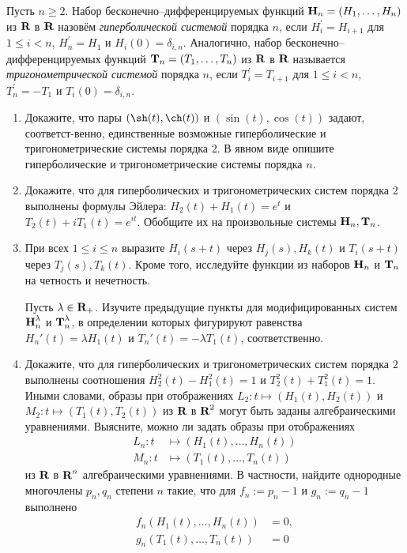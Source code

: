 \newcommand{\mmH}{\text{\bfseries H}}
\newcommand{\mmT}{\text{\bfseries T}}

Пусть $n \geq 2$. Набор бесконечно--дифференцируемых функций $\mmH_n = (H_1, \ldots, H_n)$ из $\text{\bfseries R}$ в $\text{\bfseries R}$ назовём {\itshape гиперболической системой} порядка $n$, если $H_i^\prime = H_{i+1}$ для $1 \leq i < n$, $H_n^\prime = H_1$ и $H_i(0) = \delta_{i,n}$. Аналогично, набор бесконечно--дифференцируемых функций $\mmT_n = (T_1, \ldots, T_n)$ из $\text{\bfseries R}$ в $\text{\bfseries R}$ называется {\itshape тригонометрической системой} порядка $n$, если $T_i^\prime = T_{i+1}$ для $1 \leq i < n$, $T_n^\prime = - T_1$ и $T_i(0) = \delta_{i,n}$. 

\begin{enumerate}
\item Докажите, что пары $\left(\sh(t), \ch(t)  \right)$ и $\left(\sin(t), \cos(t)\right)$ задают, соответст-\linebreak венно, единственные возможные гиперболические и тригонометрические системы порядка $2$. В явном виде опишите гиперболические и тригонометрические системы порядка $n$. 

\item Докажите, что для гиперболических и тригонометрических систем порядка $2$ выполнены
формулы Эйлера: $H_2(t) + H_1(t) = e^t$ и $T_2(t) + i T_1(t) = e^{it}.$ Обобщите их на произвольные системы $\mmH_n, \mmT_n$.

\item При всех $1 \leq i \leq n$ выразите $H_i(s+t)$ через $H_j(s), H_k(t)$ и $T_i(s+t)$ через $T_j(s), T_k(t)$. Кроме того, исследуйте функции из наборов $\mmH_n$ и $\mmT_n$ на четность и нечетность.

Пусть $\lambda \in \text{\bfseries R}_+$. Изучите предыдущие пункты для модифицированных систем $\mmH_n^\lambda$ и $\mmT_n^\lambda$, в определении которых фигурируют равенства $H_n'(t) = \lambda H_1(t)$ и $T_n'(t) = -\lambda T_1(t)$, соответственно.
\item Докажите, что для гиперболических и тригонометрических систем порядка $2$ выполнены соотношения $H_2^2(t) - H_1^2(t) = 1$ и $T_2^2(t) + T_1^2(t) = 1.$ Иными словами, образы при отображениях $L_2: t \mapsto (H_1(t), H_2(t))$ и $M_2: t \mapsto (T_1(t), T_2(t))$ из $\text{\bfseries R}$ в $\text{\bfseries R}^2$ могут быть заданы алгебраическими уравнениями. Выясните, можно ли задать образы при отображениях 
\begin{align*}
L_n: t &\longmapsto (H_1(t), \ldots, H_n(t)) \\
M_n: t &\longmapsto (T_1(t), \ldots, T_n(t))
\end{align*}
из $\text{\bfseries R}$ в $\text{\bfseries R}^n$ алгебраическими уравнениями. В частности, найдите однородные многочлены $p_n, q_n$ степени $n$ такие, что для $f_n:=p_n - 1$ и $g_n := q_n-1$ выполнено
\begin{align*}
f_n(H_1(t), \ldots, H_n(t)) &= 0, \\
g_n(T_1(t), \ldots, T_n(t)) &= 0
\end{align*} 


\end{enumerate}

